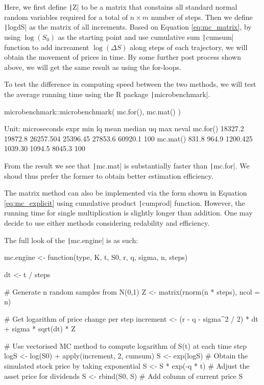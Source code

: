 Here, we first define \texttt|Z| to be a matrix that constains all standard normal random variables required for a total of $n\times m$ number of steps. Then we define \texttt|logdS| as the matrix of all increments. Based on Equation \ref{eq:mc_matrix}, by using $\log(S_0)$ as the starting point and use cumulative sum \texttt|cumsum| function to add increament $\log(\Delta S)$ along steps of each trajectory, we will obtain the movement of prices in time. By some further post process shown above, we will get the same result as using the for-loops.

To test the difference in computing speed between the two methods, we will test the average running time using the R package \texttt|microbenchmark|.

\begin{Rminted}
microbenchmark::microbenchmark(
    mc.for(),
    mc.mat()
)

    Unit: microseconds
    expr     min      lq      mean   median      uq     max neval
mc.for() 18327.2 19872.8 26257.504 25396.45 27853.6 60920.1   100
mc.mat()   831.8   964.9  1200.425  1039.30  1094.5  8045.3   100
\end{Rminted}

From the result we see that \texttt|mc.mat| is substantially faster than \texttt|mc.for|. We shoud thus prefer the former to obtain better estimation efficiency.

The matrix method can also be implemented via the form shown in Equation \ref{eq:mc_explicit} using cumulative product \texttt|cumprod| function. However, the running time for single multiplication is slightly longer than addition. One may decide to use either methods considering redability and efficiency.

The full look of the \texttt|mc.engine| is as such:

\begin{Rminted}
    mc.engine <- function(type, K, t, S0, r, q, sigma, n, steps) {

    dt <- t / steps

    # Generate n random samples from N(0,1)
    Z <- matrix(rnorm(n * steps), ncol = n)

    # Get logarithm of price change per step
    increment <- (r - q - sigma^2 / 2) * dt + sigma * sqrt(dt) * Z

    # Use vectorised MC method to compute logarithm of S(t) at each time step
    logS <- log(S0) + apply(increment, 2, cumsum)
    S <- exp(logS) # Obtain the simulated stock price by taking exponential
    S <- S * exp(-q * t) # Adjust the asset price for dividends
    S <- rbind(S0, S) # Add column of current price
    S
}
\end{Rminted}

